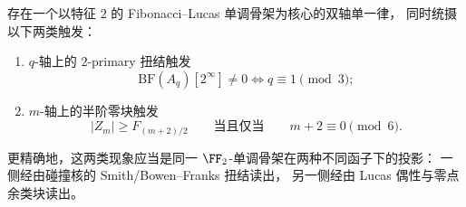 \begin{conjecture}\label{conj:conclusion-pisano3-double-axis-single-law}
存在一个以特征 \(2\) 的 Fibonacci--Lucas 单调骨架为核心的双轴单一律，
同时统摄以下两类触发：
\begin{enumerate}
  \item \(q\)-轴上的 \(2\)-primary 扭结触发
  \[
  \mathrm{BF}(A_q)[2^\infty]\neq 0
  \iff q\equiv 1\pmod 3;
  \]
  \item \(m\)-轴上的半阶零块触发
  \[
  |Z_m|\ge F_{(m+2)/2}
  \qquad\text{当且仅当}\qquad
  m+2\equiv 0\pmod 6.
  \]
\end{enumerate}
更精确地，这两类现象应当是同一 \(\FF_2\)-单调骨架在两种不同函子下的投影：
一侧经由碰撞核的 Smith/Bowen--Franks 扭结读出，
另一侧经由 Lucas 偶性与零点余类块读出。
\end{conjecture}

